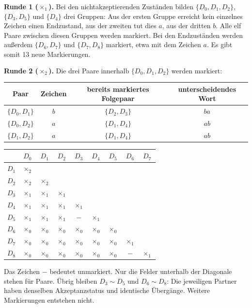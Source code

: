 \documentclass[11pt,a4paper]{article}
\begin{document}
\textbf{Runde 1 ($\times_1$).} Bei den nichtakzeptierenden Zuständen bilden
$\{D_0,D_1,D_2\}$, $\{D_3,D_5\}$ und $\{D_4\}$ drei Gruppen:
Aus der ersten Gruppe erreicht kein einzelnes Zeichen einen Endzustand,
aus der zweiten tut dies $a$, aus der dritten $b$. Alle elf Paare zwischen
diesen Gruppen werden markiert. Bei den Endzuständen werden außerdem
$\{D_6,D_7\}$ und $\{D_7,D_8\}$ markiert, etwa mit dem Zeichen $a$.
Es gibt somit 13 neue Markierungen.

\textbf{Runde 2 ($\times_2$).} Die drei Paare innerhalb
$\{D_0,D_1,D_2\}$ werden markiert:
\begin{center}
\begin{tabular}{c|c|c|c}
Paar & Zeichen & bereits markiertes Folgepaar & unterscheidendes Wort\\\hline
$\{D_0,D_1\}$ & $b$ & $\{D_2,D_3\}$ & $ba$\\
$\{D_0,D_2\}$ & $a$ & $\{D_1,D_4\}$ & $ab$\\
$\{D_1,D_2\}$ & $a$ & $\{D_1,D_4\}$ & $ab$
\end{tabular}
\end{center}
\begin{center}
\begin{tabular}{c|cccccccc}
 & $D_0$ & $D_1$ & $D_2$ & $D_3$ & $D_4$ & $D_5$ & $D_6$ & $D_7$\\\hline
$D_1$ & $\times_{2}$ &  &  &  &  &  &  & \\
$D_2$ & $\times_{2}$ & $\times_{2}$ &  &  &  &  &  & \\
$D_3$ & $\times_{1}$ & $\times_{1}$ & $\times_{1}$ &  &  &  &  & \\
$D_4$ & $\times_{1}$ & $\times_{1}$ & $\times_{1}$ & $\times_{1}$ &  &  &  & \\
$D_5$ & $\times_{1}$ & $\times_{1}$ & $\times_{1}$ & $-$ & $\times_{1}$ &  &  & \\
$D_6$ & $\times_{0}$ & $\times_{0}$ & $\times_{0}$ & $\times_{0}$ & $\times_{0}$ & $\times_{0}$ &  & \\
$D_7$ & $\times_{0}$ & $\times_{0}$ & $\times_{0}$ & $\times_{0}$ & $\times_{0}$ & $\times_{0}$ & $\times_{1}$ & \\
$D_8$ & $\times_{0}$ & $\times_{0}$ & $\times_{0}$ & $\times_{0}$ & $\times_{0}$ & $\times_{0}$ & $-$ & $\times_{1}$\\
\end{tabular}
\end{center}
Das Zeichen $-$ bedeutet unmarkiert. Nur die Felder unterhalb der Diagonale
stehen für Paare. Übrig bleiben $D_3\sim D_5$ und $D_6\sim D_8$:
Die jeweiligen Partner haben denselben Akzeptanzstatus und identische
Übergänge. Weitere Markierungen entstehen nicht.
\end{document}
